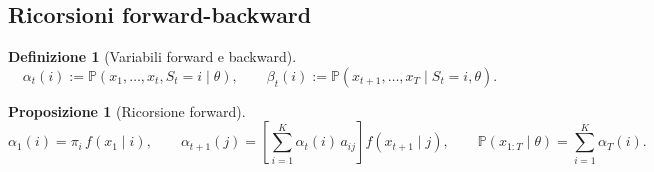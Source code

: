 \documentclass[11pt]{article}
\newtheorem{proposition}[theorem]{Proposizione}
\theoremstyle{definition}
\newtheorem{definition}[theorem]{Definizione}
\theoremstyle{remark}
\begin{document}
\subsection{Ricorsioni forward-backward}
\label{sec:forward-backward}

\begin{definition}[Variabili forward e backward]
\[
\alpha_t(i) := \mathbb{P}(x_1,\dots,x_t,S_t=i\mid\theta), \qquad
\beta_t(i) := \mathbb{P}(x_{t+1},\dots,x_T\mid S_t=i,\theta).
\]
\end{definition}

\begin{proposition}[Ricorsione forward]
\[
\alpha_1(i) = \pi_i\,f(x_1\mid i), \qquad
\alpha_{t+1}(j) = \left[\sum_{i=1}^K \alpha_t(i)\,a_{ij}\right]f(x_{t+1}\mid j), \qquad
\mathbb{P}(x_{1:T}\mid\theta) = \sum_{i=1}^K\alpha_T(i).
\]
\end{proposition}
\end{document}
